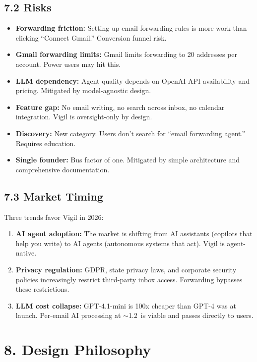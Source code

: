 \documentclass[10pt]{article}
\begin{document}
\subsection*{7.2 Risks}
\begin{itemize}[nosep]
  \item \textbf{Forwarding friction:} Setting up email forwarding rules is more work than clicking ``Connect Gmail.'' Conversion funnel risk.
  \item \textbf{Gmail forwarding limits:} Gmail limits forwarding to 20 addresses per account. Power users may hit this.
  \item \textbf{LLM dependency:} Agent quality depends on OpenAI API availability and pricing. Mitigated by model-agnostic design.
  \item \textbf{Feature gap:} No email writing, no search across inbox, no calendar integration. Vigil is oversight-only by design.
  \item \textbf{Discovery:} New category. Users don't search for ``email forwarding agent.'' Requires education.
  \item \textbf{Single founder:} Bus factor of one. Mitigated by simple architecture and comprehensive documentation.
\end{itemize}

\subsection*{7.3 Market Timing}
Three trends favor Vigil in 2026:
\begin{enumerate}[nosep]
  \item \textbf{AI agent adoption:} The market is shifting from AI assistants (copilots that help you write) to AI agents (autonomous systems that act). Vigil is agent-native.
  \item \textbf{Privacy regulation:} GDPR, state privacy laws, and corporate security policies increasingly restrict third-party inbox access. Forwarding bypasses these restrictions.
  \item \textbf{LLM cost collapse:} GPT-4.1-mini is 100x cheaper than GPT-4 was at launch. Per-email AI processing at $\sim$1.2\textcent\ is viable and passes directly to users.
\end{enumerate}

\section*{8. Design Philosophy}
\end{document}
